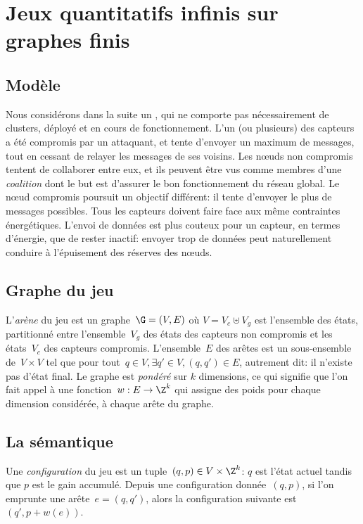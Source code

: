 \section{Jeux quantitatifs infinis sur graphes finis}
\label{tj:sec:model}

\subsection{Modèle}
Nous considérons dans la suite un \rcsf, qui ne comporte pas nécessairement de clusters, déployé et en cours de fonctionnement.
L'un (ou plusieurs) des capteurs a été compromis par un attaquant, et tente d'envoyer un maximum de messages, tout en cessant de relayer les messages de ses voisins.
Les nœuds non compromis tentent de collaborer entre eux, et ils peuvent être vus comme membres d'une \emph{coalition} dont le but est d'assurer le bon fonctionnement du réseau global.
Le nœud compromis poursuit un objectif différent: il tente d'envoyer le plus de messages possibles.
Tous les capteurs doivent faire face aux même contraintes énergétiques.
L'envoi de données est plus couteux pour un capteur, en termes d'énergie, que de rester inactif: envoyer trop de données peut naturellement conduire à l'épuisement des réserves des nœuds.

\subsection{Graphe du jeu}
L'\emph{arène} du jeu est un graphe~$\G = (V,E)$ où $V = V_c \uplus V_g$ est l'ensemble des états, partitionné entre l'ensemble~$V_g$ des états des capteurs non compromis et les états~$V_c$ des capteurs compromis.
L'ensemble~$E$ des arêtes est un sous-ensemble de~$V \times V$ tel que pour tout~$q \in V, \exists q' \in V, (q,q')\in E$, autrement dit: il n'existe pas d'état final.
Le graphe est \emph{pondéré} sur $k$ dimensions, ce qui signifie que l'on fait appel à une fonction~$w: E \rightarrow \Z^k$ qui assigne des poids pour chaque dimension considérée, à chaque arête du graphe.

\subsection{La sémantique}
Une \emph{configuration} du jeu est un tuple~$(q,p) \in V \times \Z^k$: $q$ est l'état actuel tandis que $p$ est le gain accumulé.
Depuis une configuration donnée~$(q,p)$, si l'on emprunte une arête~$e=(q,q')$, alors la configuration suivante est $(q',p+w(e))$.


